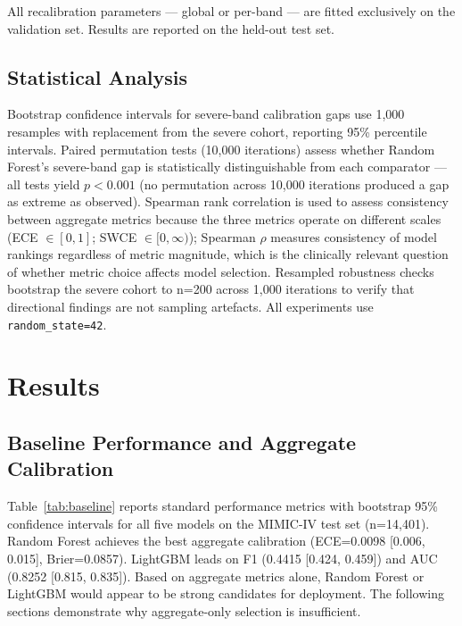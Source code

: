 \documentclass{ieeeaccess}
\begin{document}
All recalibration parameters — global or per-band — are fitted exclusively on the validation set. Results are reported on the held-out test set.

\subsection{Statistical Analysis}

Bootstrap confidence intervals for severe-band calibration gaps use 1,000 resamples with replacement from the severe cohort, reporting 95\% percentile intervals. Paired permutation tests (10,000 iterations) assess whether Random Forest's severe-band gap is statistically distinguishable from each comparator — all tests yield $p < 0.001$ (no permutation across 10,000 iterations produced a gap as extreme as observed). Spearman rank correlation is used to assess consistency between aggregate metrics because the three metrics operate on different scales (ECE $\in [0,1]$; SWCE $\in [0,\infty)$); Spearman $\rho$ measures consistency of model rankings regardless of metric magnitude, which is the clinically relevant question of whether metric choice affects model selection. Resampled robustness checks bootstrap the severe cohort to n=200 across 1,000 iterations to verify that directional findings are not sampling artefacts. All experiments use \texttt{random\_state=42}.

\section{Results}
\label{sec:results}

\subsection{Baseline Performance and Aggregate Calibration}

Table~\ref{tab:baseline} reports standard performance metrics with bootstrap 95\% confidence intervals for all five models on the MIMIC-IV test set (n=14,401). Random Forest achieves the best aggregate calibration (ECE=0.0098 [0.006, 0.015], Brier=0.0857). LightGBM leads on F1 (0.4415 [0.424, 0.459]) and AUC (0.8252 [0.815, 0.835]). Based on aggregate metrics alone, Random Forest or LightGBM would appear to be strong candidates for deployment. The following sections demonstrate why aggregate-only selection is insufficient.
\end{document}
